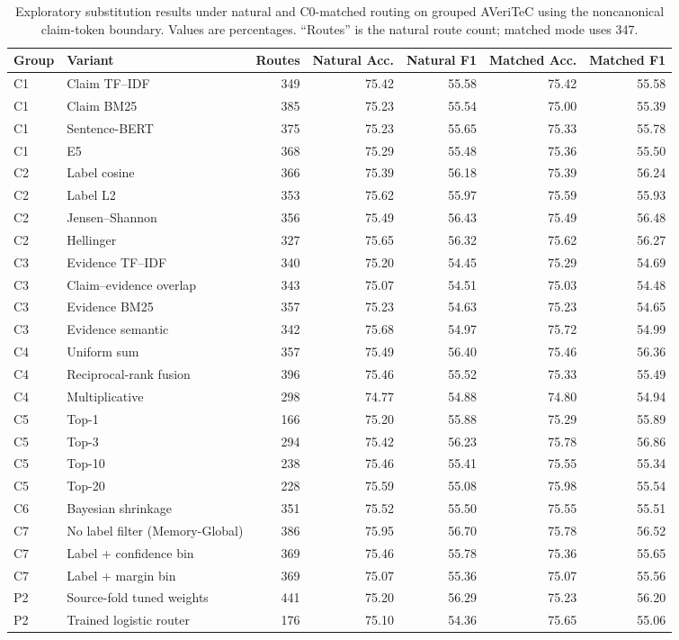 \documentclass[runningheads]{llncs}
\begin{document}
\begin{table}[t]
\caption{Exploratory substitution results under natural and C0-matched routing on grouped
AVeriTeC using the noncanonical claim-token boundary. Values are percentages.
``Routes'' is the natural route count; matched mode uses 347.}
\label{tab:group-c-appendix}
\centering\scriptsize
\begin{tabular}{llrrrrr}
\toprule
Group & Variant & Routes & Natural Acc. & Natural F1 & Matched Acc. & Matched F1 \\
\midrule
C1 & Claim TF--IDF & 349 & 75.42 & 55.58 & 75.42 & 55.58 \\
C1 & Claim BM25 & 385 & 75.23 & 55.54 & 75.00 & 55.39 \\
C1 & Sentence-BERT & 375 & 75.23 & 55.65 & 75.33 & 55.78 \\
C1 & E5 & 368 & 75.29 & 55.48 & 75.36 & 55.50 \\
C2 & Label cosine & 366 & 75.39 & 56.18 & 75.39 & 56.24 \\
C2 & Label L2 & 353 & 75.62 & 55.97 & 75.59 & 55.93 \\
C2 & Jensen--Shannon & 356 & 75.49 & 56.43 & 75.49 & 56.48 \\
C2 & Hellinger & 327 & 75.65 & 56.32 & 75.62 & 56.27 \\
C3 & Evidence TF--IDF & 340 & 75.20 & 54.45 & 75.29 & 54.69 \\
C3 & Claim--evidence overlap & 343 & 75.07 & 54.51 & 75.03 & 54.48 \\
C3 & Evidence BM25 & 357 & 75.23 & 54.63 & 75.23 & 54.65 \\
C3 & Evidence semantic & 342 & 75.68 & 54.97 & 75.72 & 54.99 \\
C4 & Uniform sum & 357 & 75.49 & 56.40 & 75.46 & 56.36 \\
C4 & Reciprocal-rank fusion & 396 & 75.46 & 55.52 & 75.33 & 55.49 \\
C4 & Multiplicative & 298 & 74.77 & 54.88 & 74.80 & 54.94 \\
C5 & Top-1 & 166 & 75.20 & 55.88 & 75.29 & 55.89 \\
C5 & Top-3 & 294 & 75.42 & 56.23 & 75.78 & 56.86 \\
C5 & Top-10 & 238 & 75.46 & 55.41 & 75.55 & 55.34 \\
C5 & Top-20 & 228 & 75.59 & 55.08 & 75.98 & 55.54 \\
C6 & Bayesian shrinkage & 351 & 75.52 & 55.50 & 75.55 & 55.51 \\
C7 & No label filter (Memory-Global) & 386 & 75.95 & 56.70 & 75.78 & 56.52 \\
C7 & Label + confidence bin & 369 & 75.46 & 55.78 & 75.36 & 55.65 \\
C7 & Label + margin bin & 369 & 75.07 & 55.36 & 75.07 & 55.56 \\
P2 & Source-fold tuned weights & 441 & 75.20 & 56.29 & 75.23 & 56.20 \\
P2 & Trained logistic router & 176 & 75.10 & 54.36 & 75.65 & 55.06 \\
\bottomrule
\end{tabular}
\end{table}
\end{document}
